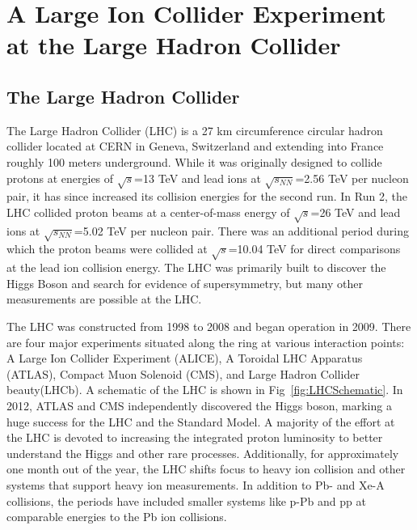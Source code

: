 \chapter{A Large Ion Collider Experiment at the Large Hadron Collider} \label{ch:ALICE}

\section{The Large Hadron Collider}

The Large Hadron Collider (LHC) is a 27 km circumference circular hadron collider located at CERN in Geneva, Switzerland and extending into France roughly 100 meters underground. While it was originally designed to collide protons at energies of $\sqrt{s}$=13 TeV and lead ions at $\sqrt{s_{NN}}$=2.56 TeV per nucleon pair, it has since increased its collision energies for the second run. In Run 2, the LHC collided proton beams at a center-of-mass energy of $\sqrt{s}$=26 TeV and lead ions at $\sqrt{s_{NN}}$=5.02 TeV per nucleon pair. There was an additional period during which the proton beams were collided at $\sqrt{s}$=10.04 TeV for direct comparisons at the lead ion collision energy. The LHC was primarily built to discover the Higgs Boson and search for evidence of supersymmetry, but many other measurements are possible at the LHC.

The  LHC was constructed from 1998 to 2008 and began  operation in 2009. There are four major experiments situated along the ring at various interaction points: A Large Ion Collider Experiment (ALICE), A Toroidal LHC Apparatus (ATLAS), Compact Muon Solenoid (CMS), and Large Hadron Collider beauty(LHCb). A schematic of the LHC is shown in Fig~\ref{fig:LHCSchematic}. In 2012, ATLAS and CMS independently discovered the Higgs boson, marking a huge success for the LHC and the Standard Model. A majority of the effort at the LHC is devoted to increasing the integrated proton luminosity to better understand the Higgs and other rare processes. Additionally, for approximately one month out of the year, the LHC shifts focus to heavy ion collision and other systems that support heavy ion measurements. In addition to Pb- and Xe-A collisions, the periods have included smaller systems like p-Pb and pp at comparable energies to the Pb ion collisions.

